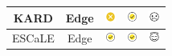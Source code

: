 \documentclass[preprint,12pt]{elsarticle}
\begin{document}
\begin{table}[htbp]
\begin{tabular}{|c|c|c|c|c|}
\hline
\rowcolor{green!20}
KARD & Edge & \includegraphics[height=10pt]{wrong.png} & \includegraphics[height=10pt]{correct.png} & \includegraphics[height=10pt]{soso.png} \\
\hline
\rowcolor{red!20}
ESCaLE & Edge & \includegraphics[height=10pt]{Correct.png} & \includegraphics[height=10pt]{correct.png} & \includegraphics[height=10pt]{goods.png} \\
\hline
\end{tabular}
\end{table}
\end{document}
